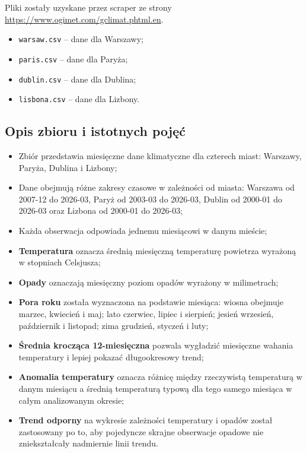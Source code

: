 \documentclass[12pt]{article}
\begin{document}
Pliki zostały uzyskane przez scraper ze strony \url{https://www.ogimet.com/gclimat.phtml.en}.

\begin{itemize}
    \item \texttt{warsaw.csv} -- dane dla Warszawy;
    \item \texttt{paris.csv} -- dane dla Paryża;
    \item \texttt{dublin.csv} -- dane dla Dublina;
    \item \texttt{lisbona.csv} -- dane dla Lizbony.
\end{itemize}

\subsection{Opis zbioru i istotnych pojęć}
\begin{itemize}
    \item Zbiór przedstawia miesięczne dane klimatyczne dla czterech miast: Warszawy, Paryża, Dublina i Lizbony;
    \item Dane obejmują różne zakresy czasowe w zależności od miasta: Warszawa od 2007-12 do 2026-03, Paryż od 2003-03 do 2026-03, Dublin od 2000-01 do 2026-03 oraz Lizbona od 2000-01 do 2026-03;
    \item Każda obserwacja odpowiada jednemu miesiącowi w danym mieście;
    \item \textbf{Temperatura} oznacza średnią miesięczną temperaturę powietrza wyrażoną w stopniach Celsjusza;
    \item \textbf{Opady} oznaczają miesięczny poziom opadów wyrażony w milimetrach;
    \item \textbf{Pora roku} została wyznaczona na podstawie miesiąca: wiosna obejmuje marzec, kwiecień i maj; lato czerwiec, lipiec i sierpień; jesień wrzesień, październik i listopad; zima grudzień, styczeń i luty;
    \item \textbf{Średnia krocząca 12-miesięczna} pozwala wygładzić miesięczne wahania temperatury i lepiej pokazać długookresowy trend;
    \item \textbf{Anomalia temperatury} oznacza różnicę między rzeczywistą temperaturą w danym miesiącu a średnią temperaturą typową dla tego samego miesiąca w całym analizowanym okresie;
    \item \textbf{Trend odporny} na wykresie zależności temperatury i opadów został zastosowany po to, aby pojedyncze skrajne obserwacje opadowe nie zniekształcały nadmiernie linii trendu.
\end{itemize}
\end{document}
